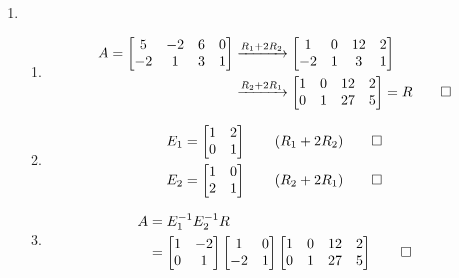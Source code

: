 \documentclass[12pt, a4paper]{article}
\begin{document}
\begin{enumerate}[Q\arabic*.]
  \item
    \begin{enumerate}[label=(a\roman*)]
      \item \begin{align*}
          A = \begin{bmatrix}5&-2&6&0\\-2&1&3&1\end{bmatrix} &\xrightarrow{R_1+2R_2}
          \begin{bmatrix}1&0&12&2\\-2&1&3&1\end{bmatrix} \\&\xrightarrow{R_2+2R_1} \begin{bmatrix}1&0&12&2\\0&1&27&5\end{bmatrix} = R \qed
        \end{align*}
      \item \begin{align*}
          E_1 &= \begin{bmatrix}1&2\\0&1\end{bmatrix}\tag*{($R_1+2R_2$)} \qed\\
          E_2 &= \begin{bmatrix}1&0\\2&1\end{bmatrix}\tag*{($R_2+2R_1$)} \qed\\
        \end{align*}
      \item \begin{align*}
          A &= E_1^{-1}E_2^{-1}R \\
            &= \begin{bmatrix}1&-2\\0&1\end{bmatrix} \begin{bmatrix}1&0\\-2&1\end{bmatrix}\begin{bmatrix}1&0&12&2\\0&1&27&5\end{bmatrix} \qed
        \end{align*}
    \end{enumerate}


\end{enumerate}
\end{document}
